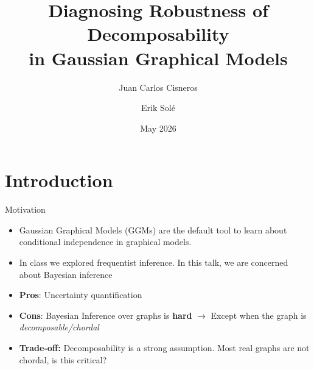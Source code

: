 

\usetikzlibrary{calc, arrows.meta}
\usepackage{float}
\usepackage{algorithm}
\newcommand{\G}{\mathcal{G}}
\title[Diagnosing Robustness of Decomposability in Gaussian Graphical Models]{Diagnosing Robustness of Decomposability \\ in Gaussian Graphical Models}
\author{Juan Carlos Cisneros \and Erik Sol\'e}
\date{May 2026}

\AtBeginDocument{\small}




\begin{frame}[plain]
    \titlepage
\end{frame}

\section{Introduction}

\begin{frame}{Motivation}
    \begin{itemize}
        \item Gaussian Graphical Models (GGMs) are the default tool to learn about conditional independence in graphical models.
        \item In class we explored frequentist inference. In this talk, we are concerned about Bayesian inference
        \item \textbf{Pros}: Uncertainty quantification
        \item \textbf{Cons}: Bayesian Inference over graphs is \textbf{hard} $\rightarrow$ Except when the graph is \textit{decomposable/chordal}
        \item \textbf{Trade-off:} Decomposability is a strong assumption. Most real graphs are not chordal, is this critical?
    \end{itemize}
\end{frame}

